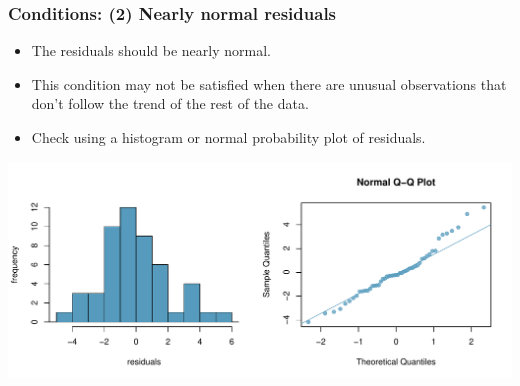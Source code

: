 
\begin{frame}
\frametitle{Conditions: (2) Nearly normal residuals}

\begin{itemize}

\item The residuals should be nearly normal.

\pause

\item This condition may not be satisfied when there are unusual observations that don't follow the trend of the rest of the data.

\pause

\item Check using a histogram or normal probability plot of residuals.

\end{itemize}

\begin{center}
\includegraphics[width=\textwidth]{8-2_least_square_reg/figures/poverty/normal_res}
\end{center}

\end{frame}


